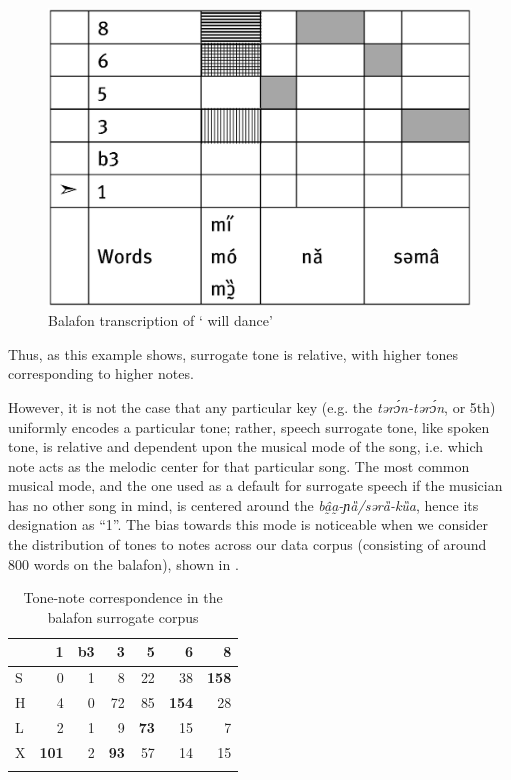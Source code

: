 \documentclass[output=paper]{langscibook}
\begin{document}
\begin{figure}
  \includegraphics[scale=.4]{figures/mi-mo-ex.eps}
  \caption{Balafon transcription of  `\underline{\hspace{1cm}} will dance'}\label{will-dance}  
\end{figure}

Thus, as this example shows, surrogate tone is relative, with higher tones corresponding to higher notes. 

However, it is not the case that any particular key (e.g. the \textit{tərɔ́n-tərɔ́n}, or 5th) uniformly encodes a particular tone; rather, speech surrogate tone, like spoken tone, is relative and dependent upon the {\sc musical mode} of the song, i.e. which note acts as the melodic center for that particular song. The most common musical mode, and the one used as a default for surrogate speech if the musician has no other song in mind, is centered around the \textit{bâ̰a̰-ɲȁ/sərȁ-kȕa}, hence its designation as ``1''. The bias towards this mode is noticeable when we consider the distribution of tones to notes across our data corpus (consisting of around 800 words on the balafon), shown in . 

\begin{table}
 \caption{Tone-note correspondence in the balafon surrogate corpus\label{tab:mcpherson:tonenote}} 
\begin{tabular}{lrrrrrr} 
\lsptoprule
   & {1} & {b3} & {3} & {5} & {6} & {8} \\ \midrule
   S & 0 & 1 & 8 & 22 & 38 & \textbf{158} \\ 
   H & 4 & 0 & 72& 85 & \textbf{154} & 28 \\ 
   L & 2 & 1 & 9 & \textbf{73} & 15 & 7 \\ 
   X & \textbf{101} & 2 & \textbf{93} & 57 & 14 & 15 \\
\lspbottomrule
\end{tabular} 
\end{table}
\end{document}
